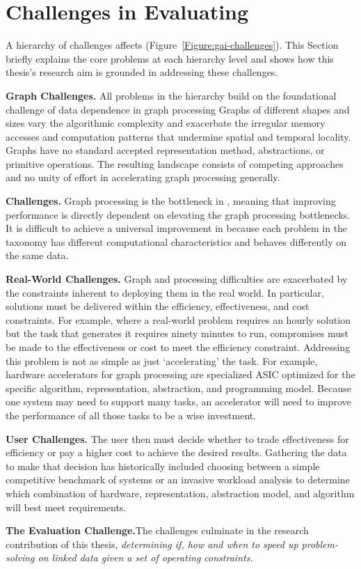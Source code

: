 \section{Challenges in Evaluating \gai}
\label{section:13-graph-based-ai-challenges}



A hierarchy of challenges affects \gai (Figure~\ref{Figure:gai-challenges}). 
This Section briefly explains the core problems at each hierarchy level and shows how this thesis's research aim is grounded in addressing these challenges. 

\textbf{Graph Challenges.} All problems in the hierarchy build on the foundational challenge of data dependence in graph processing
Graphs of different shapes and sizes vary the algorithmic complexity and exacerbate the irregular memory accesses and computation patterns that undermine spatial and temporal locality. 
Graphs have no standard accepted representation method, abstractions, or primitive operations.
The resulting landscape consists of competing approaches and no unity of effort in accelerating graph processing generally. 

\textbf{\gai Challenges.} Graph processing is the bottleneck in \gai, meaning that improving \gai performance is directly dependent on elevating the graph processing bottlenecks. 
It is difficult to achieve a universal improvement in \gai because each problem in the taxonomy has different computational characteristics and behaves differently on the same data. 


\textbf{Real-World Challenges.} Graph and \gai processing difficulties are exacerbated by the constraints inherent to deploying them in the real world. 
In particular, \gai solutions must be delivered within the efficiency, effectiveness, and cost constraints. 
For example, where a real-world problem requires an hourly solution but the \gai task that generates it requires ninety minutes to run, compromises must be made to the effectiveness or cost to meet the efficiency constraint. 
Addressing this problem is not as simple as just `accelerating' the \gai task.
For example, hardware accelerators for graph processing are specialized \ac{ASIC} optimized for the specific algorithm, representation, abstraction, and programming model.
Because one system may need to support many \gai tasks, an accelerator will need to improve the performance of all those tasks to be a wise investment. 

\textbf{User Challenges.} The user then must decide whether to trade effectiveness for efficiency or pay a higher cost to achieve the desired results.
Gathering the data to make that decision has historically included choosing between a simple competitive benchmark of systems or an invasive workload analysis to determine which combination of hardware, representation, abstraction model, and algorithm will best meet requirements. 

\textbf{The Evaluation Challenge.}The challenges culminate in the research contribution of this thesis, \textit{determining \textit{if}, \textit{how} and \textit{when} to speed up problem-solving on linked data given a set of operating constraints.}